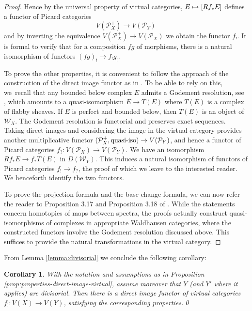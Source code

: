 \documentclass[JEP,XML,SOM,Unicode,published]{cedram}
\newcommand\mto{\mathchoice{\longmapsto}{\mapsto}{\mapsto}{\mapsto}}
\theoremstyle{plain}
\newtheorem{corollary}[theorem]{Corollary}
\theoremstyle{definition}
\newcommand{\Pcal}{\mathcal P}
\newcommand{\Wcal}{\mathcal W}
\begin{document}
\begin{proof}
Hence by the universal property of virtual categories, $E \mto [Rf_\ast E]$ defines a functor of Picard categories
\begin{displaymath}
V(\Pcal_{X}^{+}) \to V(\Pcal_{Y})
\end{displaymath}
and by inverting the equivalence $V(\Pcal^+_X) \to V(\Pcal_X)$ we obtain the functor $f_!$. It is formal to verify that for a composition $fg$ of morphisms, there is a natural isomorphism of functors $(fg)_! \to f_! g_! $.

To prove the other properties, it is convenient to follow the approach of the construction of the direct image functor as in \cite[]{ThomasonTrobaugh}. To be able to rely on this, we~recall that any bounded below complex $E$ admits a Godement resolution, see \hbox{\cite[\href{https://stacks.math.columbia.edu/tag/0FKT}{0FKT}]{stacks-project}}, which amounts to a quasi-isomorphism $E\to T(E)$ where $T(E)$ is a complex of flabby sheaves. If $E$ is perfect and bounded below, then $T(E)$ is an object of $\Wcal_{X}$. The Godement resolution is functorial and preserves exact sequences. Taking direct images and considering the image in the virtual category provides another multiplicative functor $(\Pcal_{X}^{+}, \hbox{quasi-iso}) \to V(\Pcal_{Y})$, and hence a functor of Picard categories $f_{?}\colon V(\Pcal_{X})\to V(\Pcal_{Y})$. We have an isomorphism $Rf_\ast E \to f_\ast T(E)$ in $D(\Wcal_{Y})$. This induces a natural isomorphism of functors of Picard categories $f_! \to f_?$, the proof of which we leave to the interested reader. We henceforth identify the two functors.

To prove the projection formula and the base change formula, we can now refer the reader to Proposition 3.17 and Proposition 3.18 of \cite{ThomasonTrobaugh}. While the statements concern homotopies of maps between spectra, the proofs actually construct quasi-isomorphisms of complexes in appropriate Waldhausen categories, where the constructed functors involve the Godement resolution discussed above. This suffices to provide the natural transformations in the virtual category.
\end{proof}

From Lemma \ref{lemma:divisorial} we conclude the following corollary:

\begin{corollary}
With the notation and assumptions as in Proposition \ref{prop:properties-direct-image-virtual}, assu\-me moreover that $Y$ (and $Y'$ where it applies) are divisorial. Then there is a
direct image functor of virtual categories $f_! \colon V(X)\to V(Y)$, satisfying the corresponding properties.\qed
\end{corollary}
\end{document}
